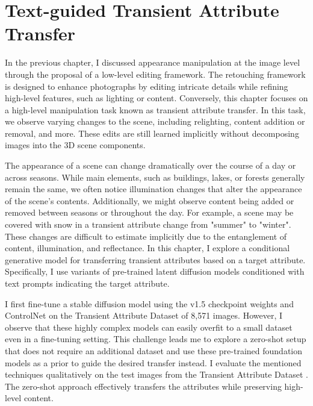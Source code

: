 \chapter{Text-guided Transient Attribute Transfer}\label{zero-shot}

In the previous chapter, I discussed appearance manipulation at the image level through the proposal of a low-level editing framework. The retouching framework is designed to enhance photographs by editing intricate details while refining high-level features, such as lighting or content. Conversely, this chapter focuses on a high-level manipulation task known as transient attribute transfer. In this task, we observe varying changes to the scene, including relighting, content addition or removal, and more. These edits are still learned implicitly without decomposing images into the 3D scene components.

The appearance of a scene can change dramatically over the course of a day or across seasons. While main elements, such as buildings, lakes, or forests generally remain the same, we often notice illumination changes that alter the appearance of the scene’s contents. Additionally, we might observe content being added or removed between seasons or throughout the day. For example, a scene may be covered with snow in a transient attribute change from "summer" to "winter". These changes are difficult to estimate implicitly due to the entanglement of content, illumination, and reflectance. In this chapter, I explore a conditional generative model for transferring transient attributes based on a target attribute. Specifically, I use variants of pre-trained latent diffusion models conditioned with text prompts indicating the target attribute.

I first fine-tune a stable diffusion model using the v1.5 checkpoint weights \cite{rombach2022high} and ControlNet \cite{zhang2023adding} on the Transient Attribute Dataset \cite{laffont2014transient} of 8,571 images. However, I observe that these highly complex models can easily overfit to a small dataset even in a fine-tuning setting. This challenge leads me to explore a zero-shot setup that does not require an additional dataset and use these pre-trained foundation models as a prior to guide the desired transfer instead. I evaluate the mentioned techniques qualitatively on the test images from the Transient Attribute Dataset \cite{laffont2014transient} . The zero-shot approach effectively transfers the attributes while preserving high-level content.


